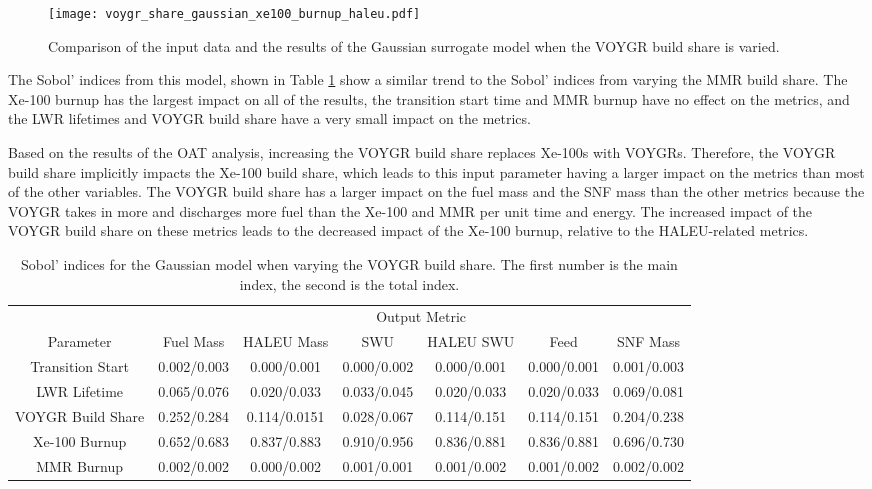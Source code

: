 \begin{figure}
    \centering 
    \texttt{[image: voygr\_share\_gaussian\_xe100\_burnup\_haleu.pdf]}
    \caption{Comparison of the input data and the results of the Gaussian 
    surrogate model when the VOYGR build share is varied.}
    \label{fig:s7_voygr_gaussian}
\end{figure}

The Sobol' indices from this model, shown in Table \ref{tab:s7_sobol_voygr_gaussian}
show a similar trend to the Sobol' indices from varying the \gls{MMR}
build share. The Xe-100 burnup has the largest impact on all of the 
results, the transition start time and \gls{MMR} burnup have no 
effect on the metrics, and the \gls{LWR} lifetimes and VOYGR build share 
have a very small impact on the metrics. 

Based on the results of 
the \gls{OAT} analysis, increasing the VOYGR build share replaces 
Xe-100s with VOYGRs. Therefore, the VOYGR build share implicitly 
impacts the Xe-100 build share, which leads to this input parameter 
having a larger impact on the metrics than most of the other variables. 
The VOYGR build share has a larger impact on the fuel mass and the 
\gls{SNF} mass than the other metrics because the VOYGR takes in more 
and discharges more 
fuel than the Xe-100 and \gls{MMR} per unit time and energy. The 
increased impact of the VOYGR build share on these metrics leads to 
the decreased impact of the Xe-100 burnup, relative to the 
\gls{HALEU}-related metrics. 

\begin{table}
    \centering
    \caption{Sobol' indices for the Gaussian model when varying the VOYGR 
    build share. The first number is the main index, the second is the total 
    index.}
    \label{tab:s7_sobol_voygr_gaussian}
    \begin{tabular}{c c c c c c c}
        \hline
        & \multicolumn{6}{c}{Output Metric} \\
        Parameter & Fuel Mass & HALEU Mass & SWU & HALEU SWU & Feed & SNF Mass \\
        \hline
        Transition Start & 0.002/0.003 & 0.000/0.001 & 0.000/0.002 & 
                           0.000/0.001 & 0.000/0.001 & 0.001/0.003\\
        LWR Lifetime & 0.065/0.076 & 0.020/0.033 & 0.033/0.045 & 
                       0.020/0.033 & 0.020/0.033 & 0.069/0.081\\
        VOYGR Build Share & 0.252/0.284 & 0.114/0.0151 & 0.028/0.067 &
                            0.114/0.151 & 0.114/0.151 & 0.204/0.238\\
        Xe-100 Burnup & \cellcolor{green!25}0.652/0.683 & \cellcolor{green!25}0.837/0.883 & \cellcolor{green!25}0.910/0.956 & 
        \cellcolor{green!25}0.836/0.881 & \cellcolor{green!25}0.836/0.881 & \cellcolor{green!25}0.696/0.730\\
        MMR Burnup & 0.002/0.002 & 0.000/0.002 & 0.001/0.001 & 
                     0.001/0.002 & 0.001/0.002 & 0.002/0.002\\
        \hline        
    \end{tabular}
\end{table}

